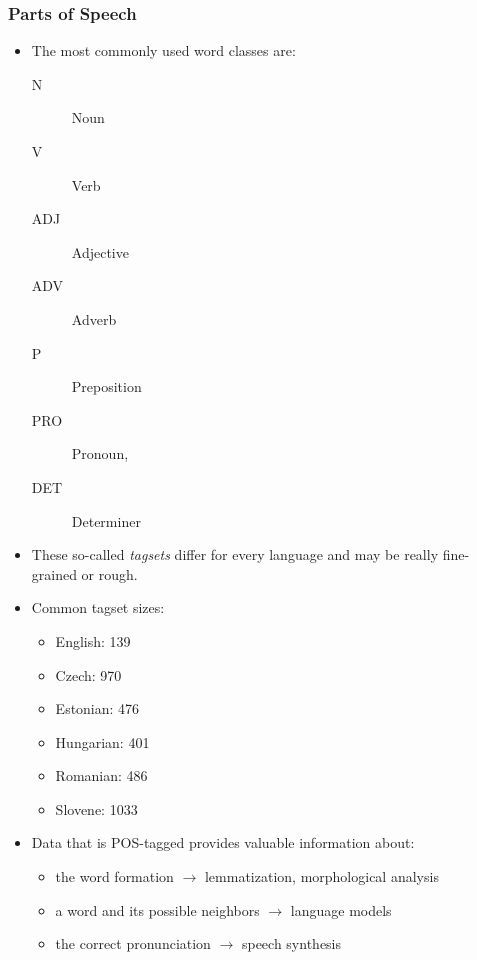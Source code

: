 \documentclass[a4paper, 11pt, accentcolor = tud3b]{tudreport}
\begin{document}
                \subsubsection{Parts of Speech} %
                    \begin{itemize}
                    	\item The most commonly used word classes are:
                    		\begin{description}
                    			\item[N] Noun
                    			\item[V] Verb
                    			\item[ADJ] Adjective
                    			\item[ADV] Adverb
                    			\item[P] Preposition
                    			\item[PRO] Pronoun,
                    			\item[DET] Determiner
                    		\end{description}
                    	\item These so-called \textit{tagsets} differ for every language and may be really fine-grained or rough.
                    	\item Common tagset sizes:
                    		\begin{itemize}
                    			\item English: 139
                    			\item Czech: 970
                    			\item Estonian: 476
                    			\item Hungarian: 401
                    			\item Romanian: 486
                    			\item Slovene: 1033
                    		\end{itemize}
                    	\item Data that is POS-tagged provides valuable information about:
                    		\begin{itemize}
                    			\item the word formation \( \rightarrow \) lemmatization, morphological analysis
                    			\item a word and its possible neighbors \( \rightarrow \) language models
                    			\item the correct pronunciation \( \rightarrow \) speech synthesis

\end{itemize}
\end{itemize}
\end{document}

